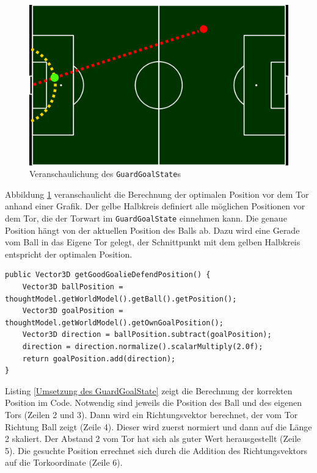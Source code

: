 \documentclass[fontsize=12pt,a4paper,final]{scrartcl}[2003/01/01]
\makeatletter
\def\ScaleIfNeeded{%
	\ifdim\Gin@nat@width>\linewidth
		\linewidth
	\else
		\Gin@nat@width
	\fi
}
\makeatother
\begin{document}
\begin{figure}[H]
	\centering
	\includegraphics[width=\ScaleIfNeeded]{Grafiken/KI/guard_goal}
	\caption{Veranschaulichung des \lstinline$GuardGoalState$s}
	\label{Veranschaulichung des GuardGoalState}
\end{figure}

Abbildung \ref{Veranschaulichung des GuardGoalState} veranschaulicht die Berechnung der optimalen Position vor dem Tor anhand einer Grafik. Der gelbe Halbkreis definiert alle möglichen Positionen vor dem Tor, die der Torwart im \lstinline$GuardGoalState$ einnehmen kann. Die genaue Position hängt von der aktuellen Position des Balls ab. Dazu wird eine Gerade vom Ball in das Eigene Tor gelegt, der Schnittpunkt mit dem gelben Halbkreis entspricht der optimalen Position.
\\

\begin{lstlisting}[caption=Umsetzung des \lstinline$GuardGoalState$s, captionpos=b, label=Umsetzung des GuardGoalState]
public Vector3D getGoodGoalieDefendPosition() {  
	Vector3D ballPosition = thoughtModel.getWorldModel().getBall().getPosition();  
	Vector3D goalPosition = thoughtModel.getWorldModel().getOwnGoalPosition();    
	Vector3D direction = ballPosition.subtract(goalPosition);  
	direction = direction.normalize().scalarMultiply(2.0f);  
	return goalPosition.add(direction);  
}  

\end{lstlisting}

Listing \ref{Umsetzung des GuardGoalState} zeigt die Berechnung der korrekten Position im Code. Notwendig sind jeweils die Position des Ball und des eigenen Tors (Zeilen 2 und 3). Dann wird ein Richtungsvektor berechnet, der vom Tor Richtung Ball zeigt (Zeile 4). Dieser wird zuerst normiert und dann auf die Länge 2 skaliert. Der Abstand 2 vom Tor hat sich als guter Wert herausgestellt (Zeile 5). Die gesuchte Position errechnet sich durch die Addition des Richtungsvektors auf die Torkoordinate (Zeile 6).
\\
\end{document}
